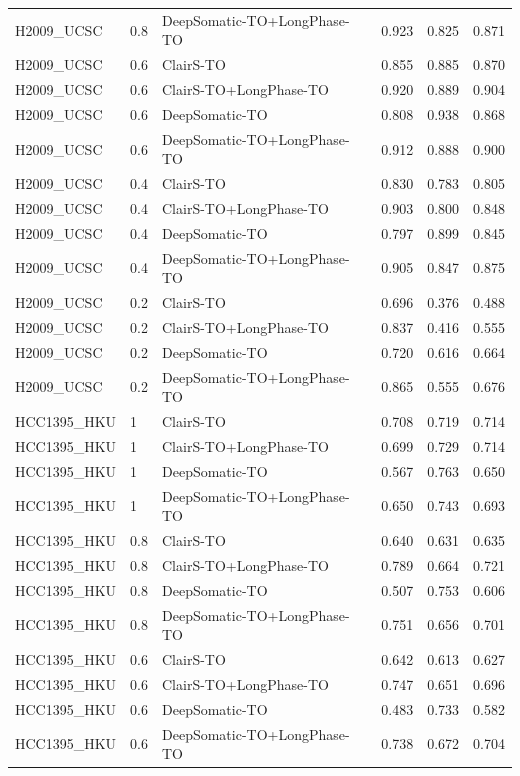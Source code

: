 \documentclass[pdflatex,sn-nature]{sn-jnl}
\begin{document}
{\begin{longtable}{@{}lllccc@{}}
  H2009\_UCSC & 0.8 & DeepSomatic-TO+LongPhase-TO & 0.923 & 0.825 & 0.871 \\
  H2009\_UCSC & 0.6 & ClairS-TO & 0.855 & 0.885 & 0.870 \\
  H2009\_UCSC & 0.6 & ClairS-TO+LongPhase-TO & 0.920 & 0.889 & 0.904 \\
  H2009\_UCSC & 0.6 & DeepSomatic-TO & 0.808 & 0.938 & 0.868 \\
  H2009\_UCSC & 0.6 & DeepSomatic-TO+LongPhase-TO & 0.912 & 0.888 & 0.900 \\
  H2009\_UCSC & 0.4 & ClairS-TO & 0.830 & 0.783 & 0.805 \\
  H2009\_UCSC & 0.4 & ClairS-TO+LongPhase-TO & 0.903 & 0.800 & 0.848 \\
  H2009\_UCSC & 0.4 & DeepSomatic-TO & 0.797 & 0.899 & 0.845 \\
  H2009\_UCSC & 0.4 & DeepSomatic-TO+LongPhase-TO & 0.905 & 0.847 & 0.875 \\
  H2009\_UCSC & 0.2 & ClairS-TO & 0.696 & 0.376 & 0.488 \\
  H2009\_UCSC & 0.2 & ClairS-TO+LongPhase-TO & 0.837 & 0.416 & 0.555 \\
  H2009\_UCSC & 0.2 & DeepSomatic-TO & 0.720 & 0.616 & 0.664 \\
  H2009\_UCSC & 0.2 & DeepSomatic-TO+LongPhase-TO & 0.865 & 0.555 & 0.676 \\
  HCC1395\_HKU & 1 & ClairS-TO & 0.708 & 0.719 & 0.714 \\
  HCC1395\_HKU & 1 & ClairS-TO+LongPhase-TO & 0.699 & 0.729 & 0.714 \\
  HCC1395\_HKU & 1 & DeepSomatic-TO & 0.567 & 0.763 & 0.650 \\
  HCC1395\_HKU & 1 & DeepSomatic-TO+LongPhase-TO & 0.650 & 0.743 & 0.693 \\
  HCC1395\_HKU & 0.8 & ClairS-TO & 0.640 & 0.631 & 0.635 \\
  HCC1395\_HKU & 0.8 & ClairS-TO+LongPhase-TO & 0.789 & 0.664 & 0.721 \\
  HCC1395\_HKU & 0.8 & DeepSomatic-TO & 0.507 & 0.753 & 0.606 \\
  HCC1395\_HKU & 0.8 & DeepSomatic-TO+LongPhase-TO & 0.751 & 0.656 & 0.701 \\
  HCC1395\_HKU & 0.6 & ClairS-TO & 0.642 & 0.613 & 0.627 \\
  HCC1395\_HKU & 0.6 & ClairS-TO+LongPhase-TO & 0.747 & 0.651 & 0.696 \\
  HCC1395\_HKU & 0.6 & DeepSomatic-TO & 0.483 & 0.733 & 0.582 \\
  HCC1395\_HKU & 0.6 & DeepSomatic-TO+LongPhase-TO & 0.738 & 0.672 & 0.704 \\

\end{longtable}}
\end{document}

